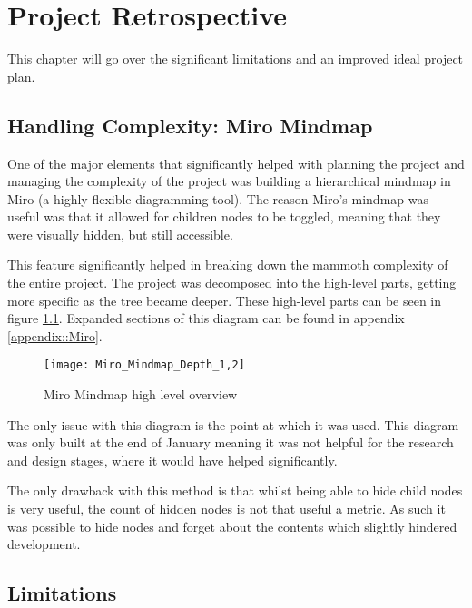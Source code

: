 \chapter{Project Retrospective}
This chapter will go over the significant limitations and an improved ideal project plan.

\section{Handling Complexity: Miro Mindmap}
One of the major elements that significantly helped with planning the project and managing the complexity of the project was building a hierarchical mindmap in Miro (a highly flexible diagramming tool). The reason Miro's mindmap was useful was that it allowed for children nodes to be toggled, meaning that they were visually hidden, but still accessible.

This feature significantly helped in breaking down the mammoth complexity of the entire project. The project was decomposed into the high-level parts, getting more specific as the tree became deeper. These high-level parts can be seen in figure \ref{figure::miro::mindmap_high_level}. Expanded sections of this diagram can be found in appendix \ref{appendix::Miro}.
\begin{figure}
    \texttt{[image: Miro\_Mindmap\_Depth\_1,2]}
    \caption{Miro Mindmap high level overview}
    \label{figure::miro::mindmap_high_level}
\end{figure}

The only issue with this diagram is the point at which it was used. This diagram was only built at the end of January meaning it was not helpful for the research and design stages, where it would have helped significantly.

The only drawback with this method is that whilst being able to hide child nodes is very useful, the count of hidden nodes is not that useful a metric. As such it was possible to hide nodes and forget about the contents which slightly hindered development.

\section{Limitations}
